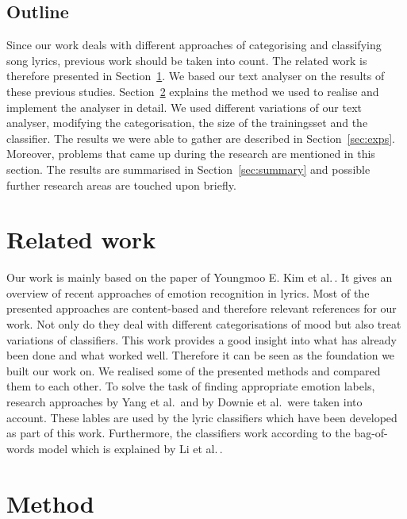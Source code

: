\documentclass[a4paper,12pt]{article}
\begin{document}
\subsection{Outline}
Since our work deals with different approaches of categorising and classifying song lyrics, previous work should be taken into count. The related work is therefore presented in Section~\ref{sec:relwork}. We based our text analyser on the results of these previous studies. Section~\ref{sec:method} explains the method we used to realise and implement the analyser in detail. We used different variations of our text analyser, modifying the categorisation, the size of the trainingsset and the classifier. The results we were able to gather are described in Section~\ref{sec:exps}. Moreover, problems that came up during the research are mentioned in this section. The results are summarised in  Section~\ref{sec:summary} and possible further research areas are touched upon briefly.

\section{Related work}
\label{sec:relwork}
Our work is mainly based on the paper of Youngmoo E. Kim et al.\,\cite{kim2010music}. It gives an overview of recent approaches of emotion recognition in lyrics.  Most of the presented approaches are content-based and  therefore relevant references for our work. Not only do they deal with different categorisations of mood but also treat variations of classifiers. This work provides a good insight into what has already been done and what worked well. Therefore it can be seen as the foundation we built our work on. We realised some of the presented methods and compared them to each other. 
To solve the task of finding appropriate emotion labels, research approaches by Yang et al.\,\cite{yang2009music} and by Downie et al.\,\cite{downie20082007} were taken into account. These lables are used by the lyric classifiers which have been developed as part of this work. Furthermore, the classifiers work according to the bag-of-words model which is explained by Li et al.\,\cite{li1998classification}.

\section{Method}
\label{sec:method}
\end{document}

